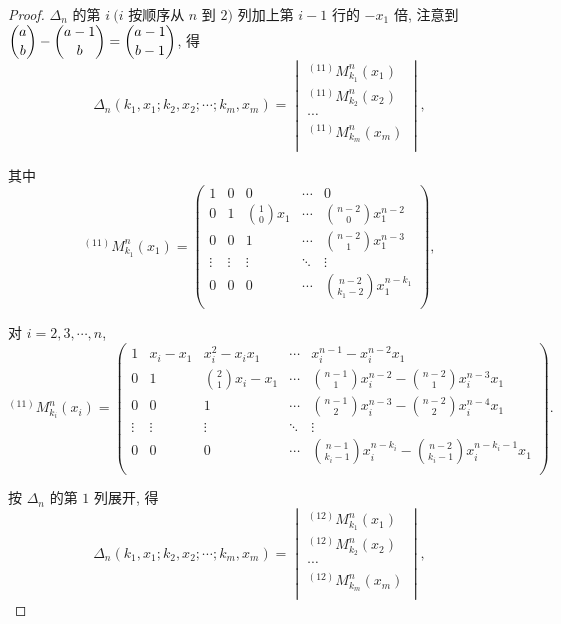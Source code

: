 \documentclass[color=black,device=normal,lang=cn,mode=geye]{elegantnote}
\begin{document}
\begin{landscape}
\begin{proof}
    $\Delta_n$ 的第 $i\ (i$ 按顺序从 $n$ 到 $2)$ 列加上第 $i-1$ 行的 $-x_1$ 倍, 注意到 $\dbinom{a}{b}-\dbinom{a-1}{b}=\dbinom{a-1}{b-1}$, 得
    \[\Delta_n(k_1,x_1;k_2,x_2;\cdots;k_m,x_m)=\begin{vmatrix}
        ^{(11)}M_{k_1}^n(x_1) \\
        ^{(11)}M_{k_2}^n(x_2) \\
        \cdots \\
        ^{(11)}M_{k_m}^n(x_m) \\
    \end{vmatrix},\]

    其中
    \[^{(11)}M_{k_1}^n(x_1)=\begin{pmatrix}
        1 & 0 & 0 & \cdots & 0 \\[4pt]
        0 & 1 & \binom{1}{0}x_1 & \cdots & \binom{n-2}{0}x_1^{n-2} \\[10pt]
        0 & 0 & 1 & \cdots & \binom{n-2}{1}x_1^{n-3} \\
        \vdots & \vdots & \vdots & \ddots & \vdots \\[4pt]
        0 & 0 & 0 & \cdots & \binom{n-2}{k_1-2}x_1^{n-k_1} \\
    \end{pmatrix},\]

    对 $i=2,3,\cdots,n$,
    \[^{(11)}M_{k_i}^n(x_i)=\begin{pmatrix}
        1 & x_i-x_1 & x_i^2-x_ix_1 & \cdots & x_i^{n-1}-x_i^{n-2}x_1 \\[4pt]
        0 & 1 & \binom{2}{1}x_i-x_1 & \cdots & \binom{n-1}{1}x_i^{n-2}-\binom{n-2}{1}x_i^{n-3}x_1 \\[10pt]
        0 & 0 & 1 & \cdots & \binom{n-1}{2}x_i^{n-3}-\binom{n-2}{2}x_i^{n-4}x_1 \\
        \vdots & \vdots & \vdots & \ddots & \vdots \\[4pt]
        0 & 0 & 0 & \cdots & \binom{n-1}{k_i-1}x_i^{n-k_i}-\binom{n-2}{k_i-1}x_i^{n-k_i-1}x_1 \\
    \end{pmatrix}.\]

    按 $\Delta_n$ 的第 $1$ 列展开, 得
    \[\Delta_n(k_1,x_1;k_2,x_2;\cdots;k_m,x_m)=\begin{vmatrix}
        ^{(12)}M_{k_1}^n(x_1) \\
        ^{(12)}M_{k_2}^n(x_2) \\
        \cdots \\
        ^{(12)}M_{k_m}^n(x_m) \\
    \end{vmatrix},\]


\end{proof}
\end{landscape}
\end{document}
